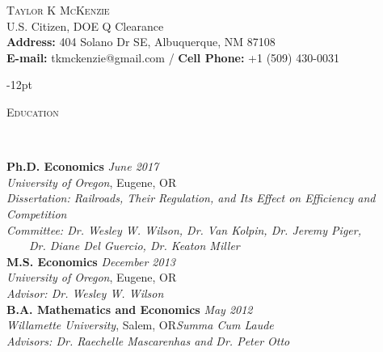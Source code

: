 \documentclass[11pt]{article}
\newenvironment{changemargin}[2]{%
  \begin{list}{}{%
    \setlength{\topsep}{0pt}%
    \setlength{\leftmargin}{#1}%
    \setlength{\rightmargin}{#2}%
    \setlength{\listparindent}{\parindent}%
    \setlength{\itemindent}{\parindent}%
    \setlength{\parsep}{\parskip}%
  }%
  \item[]}{\end{list}
}
\newcommand{\lineover}{
	\begin{changemargin}{-0.05in}{-0.05in}
		\vspace*{-8pt}
		\hrulefill \\
		\vspace*{-2pt}
	\end{changemargin}
}
\newcommand{\header}[1]{
	\begin{changemargin}{-0.5in}{-0.5in}
		\scshape{#1}\\
	\vspace*{-5pt}
  	\lineover
	\end{changemargin}
}
\newcommand{\contact}[4]{
	\begin{changemargin}{-0.5in}{-0.5in}
		\begin{center}
			{\Large \scshape {#1}}\\ \smallskip
			{#2}\\ \smallskip 
			{#3}\\ \smallskip
			{#4}\smallskip
		\end{center}
	\end{changemargin}
}
\newenvironment{body} {
	\vspace*{-16pt}
	\begin{changemargin}{-0.25in}{-0.5in}
  }	
	{\end{changemargin}
}
\begin{document}



\contact{\vspace*{-5ex}Taylor K McKenzie}{U.S. Citizen, DOE Q Clearance\\ \textbf{Address:} 404 Solano Dr SE, Albuquerque, NM 87108}{\vspace*{-0.75ex}\textbf{E-mail:} tkmckenzie@gmail.com / \textbf{Cell Phone:} +1 (509) 430-0031}

\vspace{-12pt}
\header{Education}

\begin{body}
	\vspace{14pt}
	\textbf{Ph.D. Economics}{} \hfill \emph{June 2017}{} \\
	\emph{University of Oregon}, Eugene, OR{}\\
	\emph{Dissertation: Railroads, Their Regulation, and Its Effect on Efficiency and Competition}\\
	\emph{Committee: Dr. Wesley W. Wilson, Dr. Van Kolpin, Dr. Jeremy Piger,}\\
	\ \ \ \ \emph{Dr. Diane Del Guercio, Dr. Keaton Miller}\\
	\vspace*{0pt}
	\textbf{M.S. Economics}{} \hfill \emph{December 2013}{} \\
	\emph{University of Oregon}, Eugene, OR{}\\
	\emph{Advisor: Dr. Wesley W. Wilson} \\
	\vspace*{0pt}
  	\textbf{B.A. Mathematics and Economics}{} \hfill \emph{May 2012}{} \\
	\emph{Willamette University}, Salem, OR{}\hfill \emph{Summa Cum Laude}{}\\
	\emph{Advisors: Dr. Raechelle Mascarenhas and Dr. Peter Otto} {} \hfill\\
\end{body}
\smallskip
\vspace{-6pt}
\end{document}
